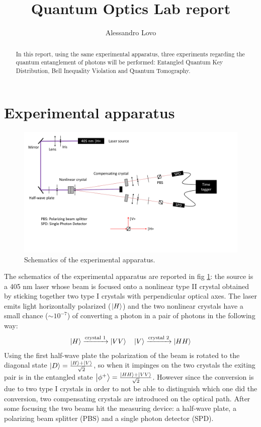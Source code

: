 \documentclass[a4paper, 11pt]{article}
\begin{document}
\title{Quantum Optics Lab report}
\author{Alessandro Lovo}

\maketitle

\begin{abstract}
  In this report, using the same experimental apparatus, three experiments regarding the quantum entanglement of photons will be performed: Entangled Quantum Key Distribution, Bell Inequality Violation and Quantum Tomography.
\end{abstract}


\section{Experimental apparatus}
  \begin{figure}[H]
    \includegraphics[width=1.0\textwidth]{img/apparatus.pdf}
    \caption{Schematics of the experimental apparatus.}
    \label{fig:apparatus}
  \end{figure}
  The schematics of the experimental apparatus are reported in fig \ref{fig:apparatus}: the source is a 405 \si{\nano\meter} laser whose beam is focused onto a nonlinear type II crystal obtained by sticking together two type I crystals with perpendicular optical axes. The laser emits light horizontally polarized ($\ket{H}$) and the two nonlinear crystals have a small chance ($\sim 10^{-7}$) of converting a photon in a pair of photons in the following way:
  \begin{gather*}
    \ket{H} \xrightarrow[]{\text{crystal 1}} \ket{VV} \quad
    \ket{V} \xrightarrow[]{\text{crystal 2}} \ket{HH}
  \end{gather*}
  Using the first half-wave plate the polarization of the beam is rotated to the diagonal state $\ket{D} = \frac{\ket{H} + \ket{V}}{\sqrt{2}}$, so when it impinges on the two crystals the exiting pair is in the entangled state $\ket{\phi^+} = \frac{\ket{HH} + \ket{VV}}{\sqrt{2}}$. However since the conversion is due to two type I crystals in order to not be able to distinguish which one did the conversion, two compensating crystals are introduced on the optical path. After some focusing the two beams hit the measuring device: a half-wave plate, a polarizing beam splitter (PBS) and a single photon detector (SPD).
\end{document}
